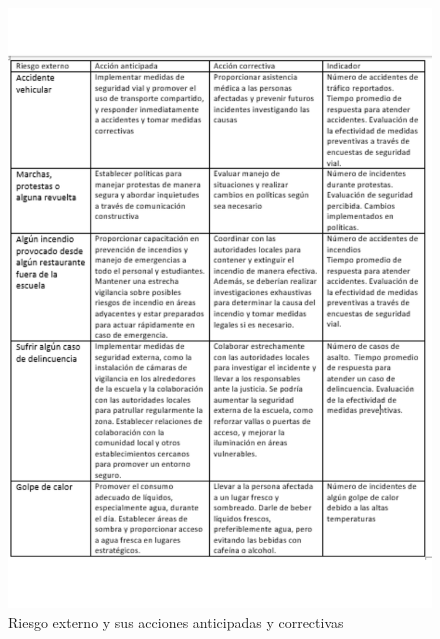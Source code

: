    \begin{figure}[H]
        \centering
        \includegraphics[scale=0.25]{30/img/Tablota de riesgo ext.pdf}
        \caption{Riesgo externo y sus acciones anticipadas y correctivas}
    \end{figure}
    
